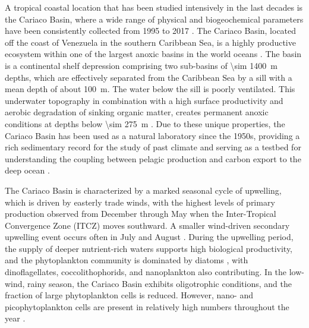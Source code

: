 \documentclass[draft]{agujournal2019}
\begin{document}
    
    A tropical coastal location that has been studied intensively in the last decades is the Cariaco Basin, where a wide range of physical and biogeochemical parameters have been consistently collected from 1995 to 2017 \cite{muller-karger_scientific_2019}. 
    The Cariaco Basin, located off the coast of Venezuela in the southern Caribbean Sea, is a highly productive ecosystem within one of the largest anoxic basins in the world oceans \cite{edgcomb_accessing_2011}. The basin is a continental shelf depression comprising two sub-basins of \qty{\sim 1400}{m} depths, which are effectively separated from the Caribbean Sea by a sill with a mean depth of about \qty{100}{m}. The water below the sill is poorly ventilated. This underwater topography in combination with a high surface productivity and aerobic degradation of sinking organic matter, creates permanent anoxic conditions at depths below \qty{\sim 275}{m} \cite{thunell_organic_2000}. Due to these unique properties, the Cariaco Basin has been used as a natural laboratory since the 1950s, providing a rich sedimentary record for the study of past climate \cite{hughen1996nature} and serving as a testbed for understanding the coupling between pelagic production and carbon export to the deep ocean \cite{montes_vertical_2012}.

    
    The Cariaco Basin is characterized by a marked seasonal cycle of upwelling, which is driven by easterly trade winds, with the highest levels of primary production observed from December through May when the Inter-Tropical Convergence Zone (ITCZ) moves southward. A smaller wind-driven secondary upwelling event occurs often in July and August \cite{mullerkarger_annual_2001, astor_seasonal_2003}. During the upwelling period, the supply of deeper nutrient-rich waters supports high biological productivity, and the phytoplankton community is dominated by diatoms \cite{romero_seasonal_2009}, with dinoflagellates, coccolithophorids, and nanoplankton also contributing. In the low-wind, rainy season, the Cariaco Basin exhibits oligotrophic conditions, and the fraction of large phytoplankton cells is reduced. However, nano- and picophytoplankton cells are present in relatively high numbers throughout the year \cite{lorenzoni_characterization_2015}.    
\end{document}
